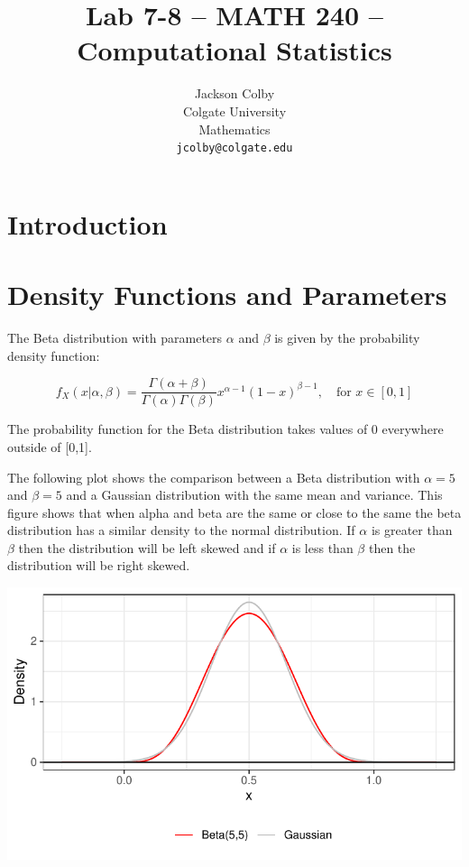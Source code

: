 \documentclass{article}\usepackage[]{graphicx}\usepackage[]{xcolor}
\makeatletter
\def\maxwidth{ %
  \ifdim\Gin@nat@width>\linewidth
    \linewidth
  \else
    \Gin@nat@width
  \fi
}
\newenvironment{knitrout}{}{} %
\makeatother
\begin{document}
\title{Lab 7-8 -- MATH 240 -- Computational Statistics}

\author{
  Jackson Colby \\
  Colgate University  \\
  Mathematics  \\
  {\tt jcolby@colgate.edu}
}

\date{}

\maketitle

\begin{multicols}{2}

\section{Introduction}

\section{Density Functions and Parameters}

The Beta distribution with parameters \( \alpha \) and \( \beta \) is given by the probability density function:

\[
f_X(x | \alpha, \beta) = \frac{\Gamma(\alpha + \beta)}{\Gamma(\alpha) \Gamma(\beta)} x^{\alpha - 1} (1 - x)^{\beta - 1}, \quad \text{for } x \in [0, 1]
\]

The probability function for the Beta distribution takes values of 0 everywhere outside of [0,1]. 


The following plot shows the comparison between a Beta distribution with \(\alpha=5\) and \(\beta=5\) and a Gaussian distribution with the same mean and variance. This figure shows that when alpha and beta are the same or close to the same the beta distribution has a similar density to the normal distribution. If \(\alpha\) is greater than \(\beta\) then the distribution will be left skewed and if \(\alpha\) is less than \(\beta\) then the distribution will be right skewed. 

\begin{knitrout}
\color{fgcolor}
\includegraphics[width=\maxwidth]{figure/unnamed-chunk-1-1} 
\end{knitrout}


\end{multicols}
\end{document}
